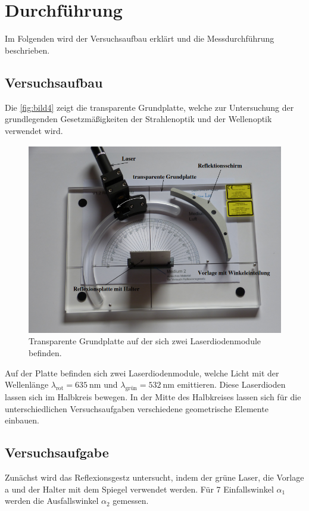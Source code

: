 \section{Durchführung}
\label{sec:durchführung}

Im Folgenden wird der Versuchsaufbau erklärt und die Messdurchführung beschrieben.

\subsection{Versuchsaufbau}
\label{sec:Versuchsaufbau}
Die \autoref{fig:bild4} zeigt die transparente Grundplatte, welche zur Untersuchung der grundlegenden Gesetzmäßigkeiten der Strahlenoptik und der Wellenoptik
verwendet wird.
\begin{figure}[H]
    \centering
	\includegraphics[width=0.6\linewidth]{content/grafik/aufbau.png}
	\caption{Transparente Grundplatte auf der sich zwei Laserdiodenmodule befinden. \cite{reflex}}
	\label{fig:bild4}
\end{figure}
Auf der Platte befinden sich zwei Laserdiodenmodule, welche Licht mit der Wellenlänge $\lambda_{\text{rot}} = \SI{635}{\nano\meter}$ und
$\lambda_{\text{grün}} = \SI{532}{\nano\meter}$ emittieren. Diese Laserdioden lassen sich im Halbkreis bewegen.
In der Mitte  des Halbkreises lassen sich für die unterschiedlichen Versuchsaufgaben verschiedene geometrische Elemente einbauen.

\subsection{Versuchsaufgabe}
\label{sec:Versuchsaufgaben}

Zunächst wird das Reflexionsgestz untersucht, indem der grüne Laser, die Vorlage a und der Halter mit dem Spiegel verwendet werden.
Für 7 Einfallswinkel $\alpha_1$ werden die Ausfallswinkel $\alpha_2$ gemessen.

